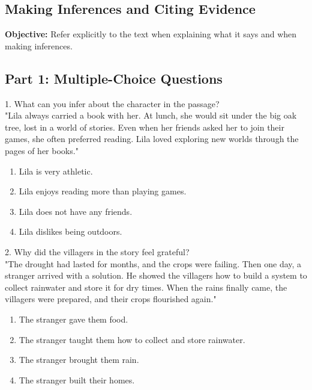 \documentclass[12pt]{article}
\begin{document}
\subsection*{Making Inferences and Citing Evidence}
\onehalfspacing

\begin{tcolorbox}[colframe=black!40, colback=gray!0, title=Learning Objective]
\textbf{Objective:} Refer explicitly to the text when explaining what it says and when making inferences.
\end{tcolorbox}

\subsection*{Part 1: Multiple-Choice Questions}

1. What can you infer about the character in the passage?\\
"Lila always carried a book with her. At lunch, she would sit under the big oak tree, lost in a world of stories. Even when her friends asked her to join their games, she often preferred reading. Lila loved exploring new worlds through the pages of her books."\\
\begin{enumerate}[label=\Alph*.]
    \item Lila is very athletic.  
    \item Lila enjoys reading more than playing games.  
    \item Lila does not have any friends.  
    \item Lila dislikes being outdoors.  
\end{enumerate}

\vspace{1cm}

2. Why did the villagers in the story feel grateful?\\
"The drought had lasted for months, and the crops were failing. Then one day, a stranger arrived with a solution. He showed the villagers how to build a system to collect rainwater and store it for dry times. When the rains finally came, the villagers were prepared, and their crops flourished again."\\
\begin{enumerate}[label=\Alph*.]
    \item The stranger gave them food.  
    \item The stranger taught them how to collect and store rainwater.  
    \item The stranger brought them rain.  
    \item The stranger built their homes.  
\end{enumerate}
\end{document}
